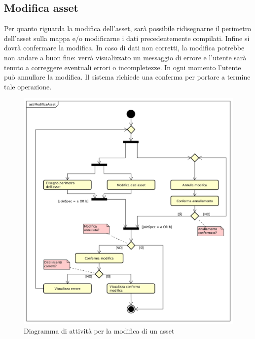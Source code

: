 \newpage
\subsection{Modifica asset}
Per quanto riguarda la modifica dell'asset, sarà possibile ridisegnarne il perimetro dell'asset sulla mappa e/o modificarne i dati precedentemente compilati. Infine si dovrà confermare la modifica. In caso di dati non corretti, la modifica potrebbe non andare a buon fine: verrà visualizzato un messaggio di errore e l'utente sarà tenuto a correggere eventuali errori o incompletezze.
In ogni momento l'utente può annullare la modifica. Il sistema richiede una conferma per portare a termine tale operazione.
\begin{figure}[H]
	\centering
	\includegraphics[width=\textwidth]{img/DiagrammiDiAttivita/ModificaAsset.png}
	\caption{Diagramma di attività per la modifica di un asset}
\end{figure}
